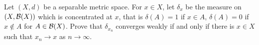 \begin{problem}{1}
Let $(X,d)$ be a separable metric space. For $x \in X$, let $\delta_x$ be the measure on $(X, \mathcal{B}(X))$ which is concentrated at $x$, that is $\delta(A) = 1$ if $x \in A$, $\delta(A) = 0$ if $x \notin A$ for $A \in \mathcal{B}(X)$. Prove that $\delta_{x_n}$ converges weakly if and only if there is $x \in X$ such that $x_n \to x$ as $n \to \infty$. 
\end{problem}